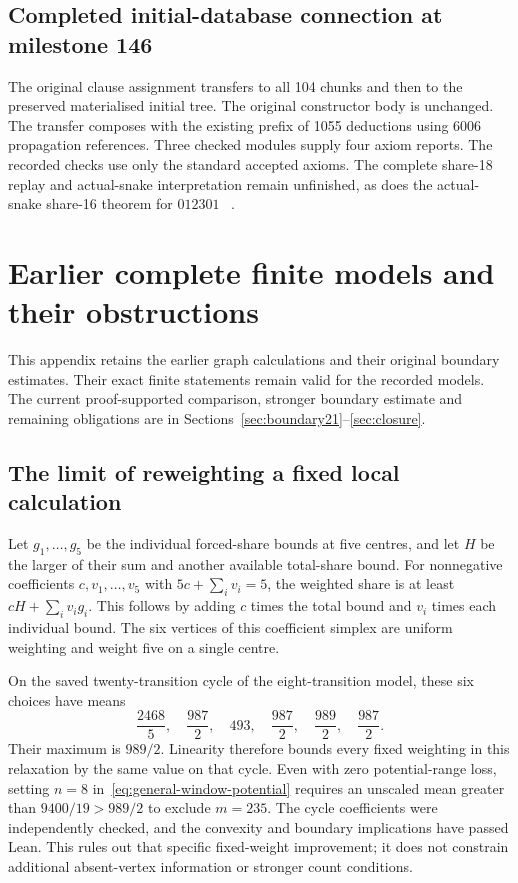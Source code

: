 \documentclass[11pt,a4paper]{article}
\theoremstyle{definition}
\theoremstyle{remark}
\begin{document}
\subsection{Completed initial-database connection at milestone 146}
The original clause assignment transfers to all 104 chunks and then to the
preserved materialised initial tree. The original constructor body is
unchanged. The transfer composes with the existing prefix of 1055 deductions
using 6006 propagation references. Three checked modules supply four axiom
reports. The recorded checks use only the standard accepted axioms.
The complete share-18 replay and actual-snake interpretation remain
unfinished, as does the actual-snake share-16 theorem for $012301$
~\cite{bridge146archive}.

\section{Earlier complete finite models and their obstructions}\label{app:earlier-long-models}
This appendix retains the earlier graph calculations and their original boundary estimates. Their exact finite statements remain valid for the recorded models. The current proof-supported comparison, stronger boundary estimate and remaining obligations are in Sections~\ref{sec:boundary21}--\ref{sec:closure}.

\subsection{The limit of reweighting a fixed local calculation}
Let $g_1,\ldots,g_5$ be the individual forced-share bounds at five centres, and let $H$ be the larger of their sum and another available total-share bound. For nonnegative coefficients $c,v_1,\ldots,v_5$ with $5c+\sum_i v_i=5$, the weighted share is at least $cH+\sum_i v_i g_i$. This follows by adding $c$ times the total bound and $v_i$ times each individual bound. The six vertices of this coefficient simplex are uniform weighting and weight five on a single centre.

On the saved twenty-transition cycle of the eight-transition model, these six choices have means
\[
\frac{2468}{5},\quad\frac{987}{2},\quad493,\quad
\frac{987}{2},\quad\frac{989}{2},\quad\frac{987}{2}.
\]
Their maximum is $989/2$. Linearity therefore bounds every fixed weighting in this relaxation by the same value on that cycle. Even with zero potential-range loss, setting $n=8$ in~\eqref{eq:general-window-potential} requires an unscaled mean greater than $9400/19>989/2$ to exclude $m=235$. The cycle coefficients were independently checked, and the convexity and boundary implications have passed Lean. This rules out that specific fixed-weight improvement; it does not constrain additional absent-vertex information or stronger count conditions.
\end{document}
